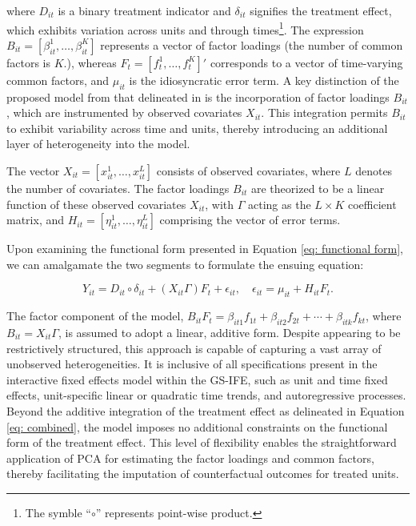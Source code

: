 \documentclass[12pt]{article}
\begin{document}
\noindent where $D_{it}$ is a binary treatment indicator and $\delta_{it}$ signifies the treatment effect, which exhibits variation across units and through times\footnote{The symble ``$\circ$'' represents point-wise product.}. The expression $B_{it} = [\beta_{it}^1, \ldots, \beta_{it}^K]$ represents a vector of factor loadings (the number of common factors is $K$.), whereas $F_{t} = [f_{t}^1, \ldots, f_{t}^K]'$ corresponds to a vector of time-varying common factors, and $\mu_{it}$ is the idiosyncratic error term. A key distinction of the proposed model from that delineated in \cite{xu2017generalized} is the incorporation of factor loadings $B_{it}$, which are instrumented by observed covariates $X_{it}$. This integration permits $B_{it}$ to exhibit variability across time and units, thereby introducing an additional layer of heterogeneity into the model.

The vector $X_{it} = [x_{it}^1, \ldots, x_{it}^L]$ consists of observed covariates, where $L$ denotes the number of covariates. The factor loadings $B_{it}$ are theorized to be a linear function of these observed covariates $X_{it}$, with $\Gamma$ acting as the $L\times K$ coefficient matrix, and $H_{it} = [\eta_{it}^1, \ldots, \eta_{it}^L]$ comprising the vector of error terms.

Upon examining the functional form presented in Equation \ref{eq: functional form}, we can amalgamate the two segments to formulate the ensuing equation:


\begin{equation}
Y_{it} = D_{it} \circ \delta_{it} + (X_{it}\Gamma) F_{t} + \epsilon_{it}, \quad \epsilon_{it} = \mu_{it} + H_{it}F_t.
\label{eq: combined}
\end{equation}

The factor component of the model, $B_{it}F_{t} = \beta_{it1}f_{1t} + \beta_{it2}f_{2t} + \cdots + \beta_{itk}f_{kt}$, where $B_{it} = X_{it}\Gamma$, is assumed to adopt a linear, additive form. Despite appearing to be restrictively structured, this approach is capable of capturing a vast array of unobserved heterogeneities. It is inclusive of all specifications present in the interactive fixed effects model within the GS-IFE, such as unit and time fixed effects, unit-specific linear or quadratic time trends, and autoregressive processes. Beyond the additive integration of the treatment effect as delineated in Equation \ref{eq: combined}, the model imposes no additional constraints on the functional form of the treatment effect. This level of flexibility enables the straightforward application of PCA for estimating the factor loadings and common factors, thereby facilitating the imputation of counterfactual outcomes for treated units.
\end{document}
